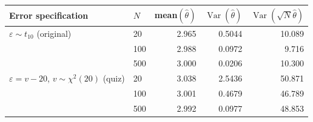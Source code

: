\begin{tabular}{llrrr}
\toprule
Error specification & $N$ & mean$(\hat\theta)$ & $\operatorname{Var}(\hat\theta)$ & $\operatorname{Var}(\sqrt{N}\hat\theta)$ \\
\midrule
$\varepsilon \sim t_{10}$ (original)
  & 20 & 2.965 & 0.5044 & 10.089 \\
  & 100 & 2.988 & 0.0972 & 9.716 \\
  & 500 & 3.000 & 0.0206 & 10.300 \\
\addlinespace
$\varepsilon = v - 20$, $v \sim \chi^2(20)$ (quiz)
  & 20 & 3.038 & 2.5436 & 50.871 \\
  & 100 & 3.001 & 0.4679 & 46.789 \\
  & 500 & 2.992 & 0.0977 & 48.853 \\
\bottomrule
\end{tabular}

